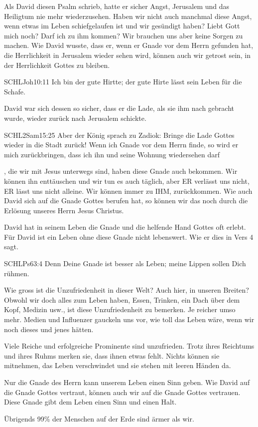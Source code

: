 \documentclass[14pt]{mybib}
\begin{document}
    \begin{otsblock}
        Als David diesen Psalm schrieb, hatte er sicher Angst, Jerusalem und das Heiligtum nie mehr wiederzusehen. Haben wir nicht auch manchmal diese Angst, wenn etwas im Leben schiefgelaufen ist und wir gesündigt haben? Liebt Gott mich  noch? Darf ich  zu ihm kommen? Wir brauchen uns aber keine Sorgen zu machen. Wie David wusste, dass er, wenn er Gnade vor dem Herrn gefunden hat, die Herrlichkeit in Jerusalem wieder sehen wird, können auch wir getrost sein, in der Herrlichkeit Gottes zu bleiben. 
          \begin{bibelbox}{SCHL}{Joh}{10:11}
            Ich bin der gute Hirtte; der gute Hirte lässt sein Leben für die Schafe.
        \end{bibelbox}
        David war sich dessen so sicher, dass er die Lade, als sie ihm nach gebracht wurde, wieder zurück nach Jerusalem schickte.
        \begin{bibelbox}{SCHL}{2Sam}{15:25}
            Aber der König sprach zu Zadiok: Bringe die Lade Gottes wieder in die Stadt zurück! Wenn ich Gnade vor dem Herrn finde, so wird er mich zurückbringen, dass ich ihn und seine Wohnung wiedersehen darf
        \end{bibelbox}
        , die wir mit Jesus unterwegs sind, haben diese Gnade auch bekommen. Wir können ihn enttäuschen und wir tun es auch täglich, aber ER verlässt uns nicht, ER lässt uns nicht alleine. Wir können immer zu IHM,  zurückkommen. Wie auch David sich auf die Gnade Gottes berufen hat, so können wir das noch  durch die Erlösung unseres Herrn Jesus Christus.
    \end{otsblock}
    \begin{otsblock}
        David hat in seinem Leben die Gnade und die helfende Hand Gottes oft erlebt. Für David ist ein Leben ohne diese Gnade nicht lebenswert. Wie er dies in Vers 4 sagt.
        \begin{bibelbox}{SCHL}{Ps}{63:4}
            Denn Deine Gnade ist besser als Leben; meine Lippen sollen Dich rühmen.
        \end{bibelbox}
        Wie gross ist die Unzufriedenheit in dieser Welt? Auch hier, in unseren Breiten? Obwohl wir doch alles zum Leben haben, Essen, Trinken, ein Dach über dem Kopf, Medizin usw., ist diese Unzufriedenheit zu bemerken. Je reicher umso mehr. Medien und Influenzer gauckeln uns vor, wie toll das Leben wäre, wenn wir noch dieses und jenes hätten.
        
        Viele Reiche und erfolgreiche Prominente sind unzufrieden. Trotz ihres Reichtums und ihres Ruhms merken sie, dass ihnen etwas fehlt. Nichts können sie mitnehmen, das Leben verschwindet und sie stehen mit leeren Händen da.
        
        Nur die Gnade des Herrn kann unserem Leben einen Sinn geben. Wie David auf die Gnade Gottes vertraut, können auch wir auf die Gnade Gottes vertrauen. Diese Gnade gibt dem Leben einen Sinn und einen Halt.

        Übrigends 99\% der Menschen auf der Erde sind ärmer als wir.
    \end{otsblock}
\end{document}
